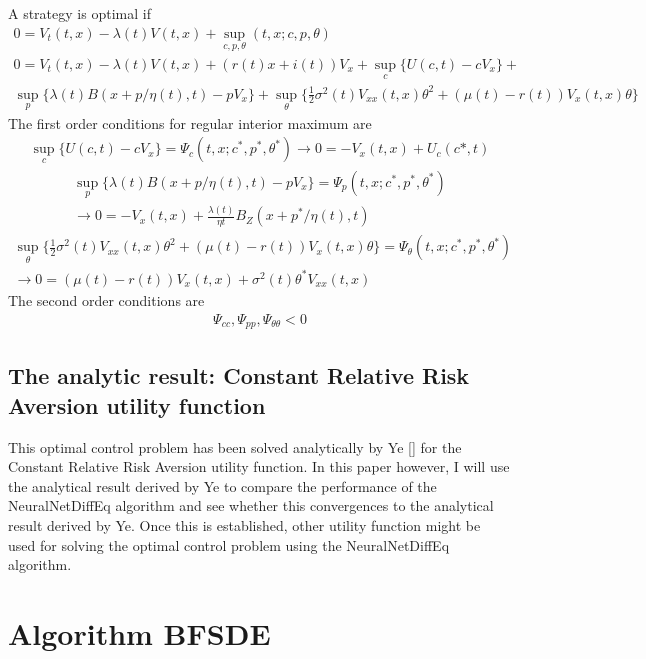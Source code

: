 \documentclass[letterpaper,10pt,english]{jupyterBook}
\begin{document}
\sphinxAtStartPar
A strategy is optimal if
\begin{gather*}
0 =V_t(t,x) -\lambda(t)V(t,x) + \sup_{c,p,\theta}(t,x;c,p,\theta)  \\
0 = V_t(t,x) -\lambda(t)V(t,x) + (r(t)x+ i(t))V_x + \sup_c\{U(c,t)-cV_x\} + \\ \sup_p\{\lambda(t)B(x + p/\eta(t),t) - pV_x\} + \sup_\theta \{ \frac{1}{2}\sigma^2(t)V_{xx}(t,x)\theta^2 +(\mu(t) - r(t))V_x(t,x)\theta\} 
\end{gather*}
\sphinxAtStartPar
The first order conditions for regular interior maximum are
\begin{equation*}
\begin{split}\sup_c  \{ U(c,t) - cV_x\} = \Psi_c(t,x;c^*,p^*,\theta^*)  \rightarrow  0 = -V_x(t,x) + U_c(c*,t) \end{split}
\end{equation*}\begin{equation*}
\begin{split} \sup_p\{\lambda(t)B(x + p/\eta(t),t) - pV_x\} = \Psi_p(t,x;c^*,p^*,\theta^*) \\ \rightarrow 0 = -V_x(t,x) + \frac{\lambda(t)}{\eta{t}}B_Z(x + p^*/\eta(t),t) \end{split}
\end{equation*}\begin{equation*}
\begin{split} \sup_\theta \{ \frac{1}{2}\sigma^2(t)V_{xx}(t,x)\theta^2 +(\mu(t) - r(t))V_x(t,x)\theta\} = \Psi_\theta(t,x;c^*,p^*,\theta^*)\\ \rightarrow 0 = (\mu(t) -r(t))V_x(t,x) + \sigma^2(t)\theta^*V_{xx}(t,x) \end{split}
\end{equation*}
\sphinxAtStartPar
The second order conditions are
\begin{equation*}
\begin{split} \Psi_{cc}, \Psi_{pp}, \Psi_{\theta \theta} < 0 \end{split}
\end{equation*}

\subsection{The analytic result: Constant Relative Risk Aversion utility function}
\label{\detokenize{Financial_application:the-analytic-result-constant-relative-risk-aversion-utility-function}}
\sphinxAtStartPar
This optimal control problem has been solved analytically by Ye {[}{]} for the Constant Relative Risk Aversion utility function. In this paper however, I will use the analytical result derived by Ye to compare the performance of the NeuralNetDiffEq algorithm and see whether this convergences to the analytical result derived by Ye. Once this is established, other utility function might be used for solving the optimal control problem using the NeuralNetDiffEq algorithm.


\section{Algorithm BFSDE}
\label{\detokenize{Financial_application:algorithm-bfsde}}






\renewcommand{\indexname}{Index}
\printindex
\end{document}
